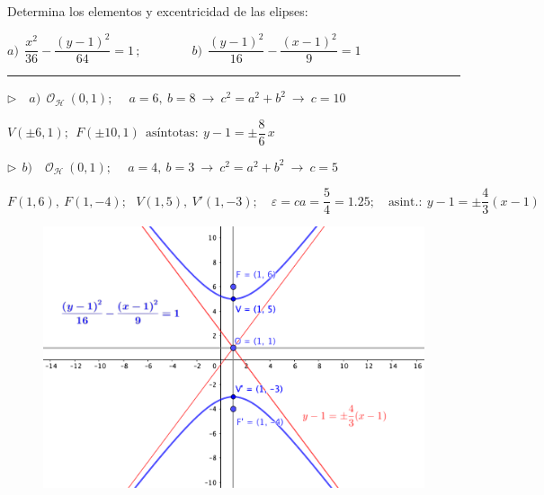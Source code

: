 \begin{miejercicio}

Determina los elementos y excentricidad de las elipses:
	
	\vspace{2mm}$a)\ \ \dfrac{x^2}{36}-\dfrac{(y-1)^2}{64}=1\, ; \qquad \qquad b)\ \ \dfrac{(y-1)^2}{16}- \dfrac{(x-1)^2}{9}=1$

\rule{250pt}{0.1pt}

\vspace{4mm}$\triangleright \quad a)\ \ \mathcal O_{\mathcal H}\ (0,1);\ \quad a=6,\ b=8 \ \to \ c^2=a^2+b^2 \ \to\ c=10$

\vspace{2mm}$ V(\pm 6,1);\ \ F(\pm10,1)\ \ \text{asíntotas}:\ y-1=\pm \dfrac 8 6 \, x$

\vspace{6mm}$\triangleright \ \ b)\quad \mathcal O_{\mathcal H}\ (0,1);\ \quad a=4,\ b=3 \ \to \ c^2=a^2+b^2\ \to \ c=5$

\vspace{2mm} $F(1,6),\ F(1,-4);\ \ \ V(1,5),\  V'(1,-3);\quad \varepsilon=c a=\dfrac 5 4=1.25;\quad \text{asint.}:\ y-1=\pm \dfrac 4 3 (x-1)$

\begin{figure}[H]
	\centering
	\includegraphics[width=.8\textwidth]{img-conicas/conicas32.png}
	\end{figure}
	
\end{miejercicio}


\vspace{5mm}

